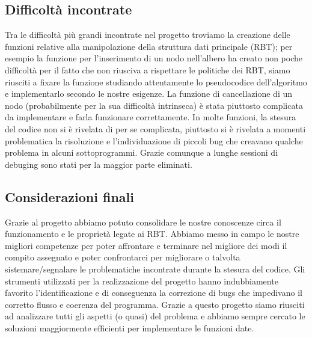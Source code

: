 \documentclass[paper=a4, fontsize=11pt,twoside]{scrartcl}   %
\begin{document}
			\subsection{Difficoltà incontrate}
				Tra le difficoltà più grandi incontrate nel progetto troviamo la creazione delle funzioni relative alla manipolazione della struttura dati principale (RBT); per esempio la funzione per l'inserimento di un nodo nell'albero ha creato non poche difficoltà per il fatto che non riusciva a rispettare le politiche dei RBT, siamo riusciti a fixare la funzione studiando attentamente lo pseudocodice dell'algoritmo e implementarlo secondo le nostre esigenze. La funzione di cancellazione di un nodo (probabilmente per la sua difficoltà intrinseca) è stata piuttosto complicata da implementare e farla funzionare correttamente. In molte funzioni, la stesura del codice non si è rivelata di per se complicata, piuttosto si è rivelata a momenti problematica la risoluzione e l’individuazione di piccoli bug che creavano qualche problema in alcuni sottoprogrammi. Grazie comunque a lunghe sessioni di debuging sono stati per la maggior parte eliminati.
				
			\subsection{Considerazioni finali}
				Grazie al progetto abbiamo potuto consolidare le nostre conoscenze circa il funzionamento e le proprietà legate ai RBT. Abbiamo messo in campo le nostre migliori competenze per poter affrontare e terminare nel migliore dei modi il compito assegnato e poter confrontarci per migliorare o talvolta sistemare/segnalare le problematiche incontrate durante la stesura del codice. Gli strumenti utilizzati per la realizzazione del progetto hanno indubbiamente favorito l'identificazione e di conseguenza la correzione di bugs che impedivano il corretto flusso e coerenza del programma.
				Grazie a questo progetto siamo riusciti ad analizzare tutti gli aspetti (o quasi) del problema e abbiamo sempre cercato le soluzioni maggiormente efficienti per implementare le funzioni date.

								
		 
\end{document}
